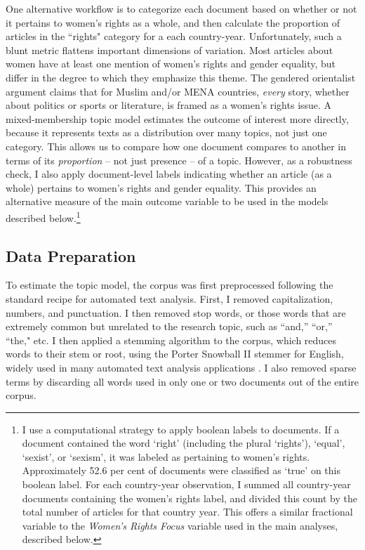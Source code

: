\documentclass[11pt, oneside]{article}
\begin{document}
One alternative workflow is to categorize each document based on whether or not it pertains to women's rights as a whole, and then calculate the proportion of articles in the ``rights" category for a each country-year. Unfortunately, such a blunt metric flattens important dimensions of variation. Most articles about women have at least one mention of women's rights and gender equality, but differ in the degree to which they emphasize this theme. The gendered orientalist argument claims that for Muslim and/or MENA countries, \emph{every} story, whether about politics or sports or literature, is framed as a women's rights issue. A mixed-membership topic model estimates the outcome of interest more directly, because it represents texts as a distribution over many topics, not just one category. This allows us to compare how one document compares to another in terms of its \emph{proportion} -- not just presence -- of a topic. However, as a robustness check, I also apply document-level labels indicating whether an article (as a whole) pertains to women's rights and gender equality. This provides an alternative measure of the main outcome variable to be used in the models described below.\footnote{\hspace{5}I use a computational strategy to apply boolean labels to documents. If a document contained the word `right' (including the plural `rights'), `equal', `sexist', or `sexism', it was labeled as pertaining to women's rights. Approximately 52.6 per cent of documents were classified as `true' on this boolean label. For each country-year observation, I summed all country-year documents containing the women's rights label, and divided this count by the total number of articles for that country year. This offers a similar fractional variable to the \emph{Women's Rights Focus} variable used in the main analyses, described below.}


\subsection{Data Preparation}

To estimate the topic model, the corpus was first preprocessed following the standard recipe for automated text analysis. First, I removed capitalization, numbers, and punctuation. I then removed stop words, or those words that are extremely common but unrelated to the research topic, such as ``and,'' ``or,'' ``the," etc.  I then applied a stemming algorithm to the corpus, which reduces words to their stem or root, using the Porter Snowball II stemmer for English, widely used in many automated text analysis applications \cite{porter2001,willett2006porter}. I also removed sparse terms by discarding all words used in only one or two documents out of the entire corpus. 
\end{document}
